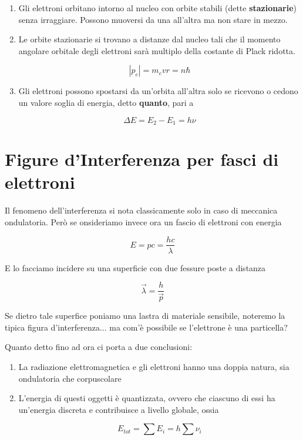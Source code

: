 \begin{enumerate}
	
	\item Gli elettroni orbitano intorno al nucleo con orbite stabili (dette \textbf{stazionarie}) senza irraggiare. Possono muoversi da una all'altra ma non stare in mezzo.
	
	\item Le orbite stazionarie si trovano a distanze dal nucleo tali che il momento angolare orbitale degli elettroni sarà multiplo della costante di Plack ridotta.
	
	\begin{equation}
	|p_e|= m_e v r= n \hbar
	\end{equation}
	
	\item Gli elettroni possono spostarsi da un'orbita all'altra solo se ricevono o cedono un valore soglia di energia, detto \textbf{quanto}, pari a 
	
	\begin{equation}
	\Delta E = E_2 - E_1 = h \nu
	\end{equation}

\end{enumerate} 

	\newpage
\section{Figure d'Interferenza per fasci di elettroni}

Il fenomeno dell'interferenza si nota classicamente solo in caso di meccanica ondulatoria.
Per\`o se onsideriamo invece ora un fascio di elettroni con energia 

\begin{equation}
E= pc = \frac{hc}{\lambda}
\end{equation}

E lo facciamo incidere su una superficie con due fessure poste a distanza 

\begin{equation}
\vec{\lambda}= \frac{h}{\vec{p}}
\end{equation}

Se dietro tale superfice poniamo una lastra di materiale sensibile, noteremo la tipica figura d'interferenza... ma com'è possibile se l'elettrone è una particella?

Quanto detto fino ad ora ci porta a due conclusioni:

\begin{enumerate}
	\item La radiazione elettromagnetica e gli elettroni hanno una doppia natura, sia ondulatoria che corpuscolare
	\item L'energia di questi oggetti è quantizzata, ovvero che ciascuno di essi ha un'energia discreta e contribuisce a livello globale, ossia
	
	\begin{equation}
	E_{tot}= \sum{E_i} = h\sum{\nu_i}
\end{equation}

\end{enumerate}

